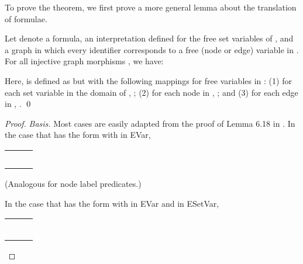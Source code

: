 \documentclass{llncs}
\begin{document}
	To prove the theorem, we first prove a more general lemma about the translation of formulae.
	
	
	\begin{lemma}\label{lemma:Cond}\rm
		Let  denote a formula,  an interpretation defined for the free set variables of , and  a graph in which every identifier  corresponds to a free (node or edge) variable  in . For all injective graph morphisms , we have:
		

		\noindent Here,  is defined as  but with the following mappings for free variables in : (1) for each set variable  in the domain of , ; (2) for each node  in , ; and (3) for each edge  in , .
	\qed
	\end{lemma}
	
	\begin{proof}
		\emph{Basis.} Most cases are easily adapted from the proof of Lemma 6.18 in \cite{Poskitt13a}. In the case that  has the form  with  in EVar,\\
		
		\begin{center}\begin{tabular}{r c l }
			 &  &  \\
			
			&&   \\
			
			&  &   \\
			
			&  &  \\
			
			&& 
		\end{tabular}\end{center}
		
		\noindent (Analogous for node label predicates.)
		
		In the case that  has the form  with  in EVar and  in ESetVar,
		
		\begin{center}\begin{tabular}{r c l }
			 &  &  \\
			
			&&   \\
			
			&  &   \\
			
			&  &  \\
			
			&  &  \\
			
			&& 
		\end{tabular}\end{center}
		

\end{proof}
\end{document}
